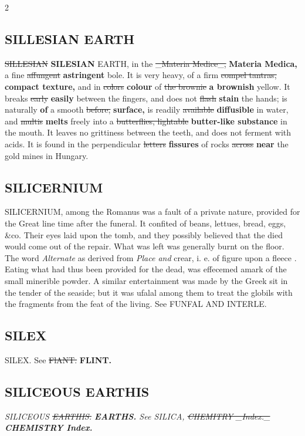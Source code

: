\documentclass[10pt]{article}
\begin{document}
\begin{multicols}{2}
\subsection*{SILLESIAN EARTH}
\sout{SILLESIAN} \textbf{SILESIAN} EARTH, in the \sout{\_Materia Medice\_,} \textbf{Materia Medica,} a fine \sout{affungent} \textbf{astringent} bole. It is very heavy, of a firm \sout{compel tantras,} \textbf{compact texture,} and in \sout{colors} \textbf{colour} of \sout{the brownie} \textbf{a brownish} yellow. It breaks \sout{early} \textbf{easily} between the fingers, and does not \sout{flash} \textbf{stain} the hands; is naturally \textbf{of} a smooth \sout{before,} \textbf{surface,} is readily \sout{available} \textbf{diffusible} in water, and \sout{multis} \textbf{melts} freely into a \sout{butterflies, lightable} \textbf{butter-like substance} in the mouth. It leaves no grittiness between the teeth, and does not ferment with acids. It is found in the perpendicular \sout{letters} \textbf{fissures} of rocks \sout{across} \textbf{near} the gold mines in Hungary.

\subsection*{SILICERNIUM}
SILICERNIUM, among the Romanus was a fault of a private nature, provided for the Great line time after the funeral. It confited of beans, lettues, bread, eggs, \&co. Their eyes laid upon the tomb, and they possibly believed that the died would come out of the repair. What was left was generally burnt on the floor. The word \emph{Alternate} as derived from \emph{Place and} crear, i. e. of figure upon a fleece . Eating what had thus been provided for the dead, was effecemed amark of the small minerible powder. A similar entertainment was made by the Greek sit in the tender of the seaside; but it was ufalal among them to treat the globils with the fragments from the feat of the living. See FUNFAL AND INTERLE.

\subsection*{SILEX}
SILEX. See \sout{FlANT.} \textbf{FLINT.}

\subsection*{SILICEOUS EARTHIS}
\textit{SILICEOUS \sout{EARTHIS.} \textbf{EARTHS.} See SILICA, \sout{CHEMITRY \_Index.\_} \textbf{CHEMISTRY Index.}}


\end{multicols}
\end{document}
